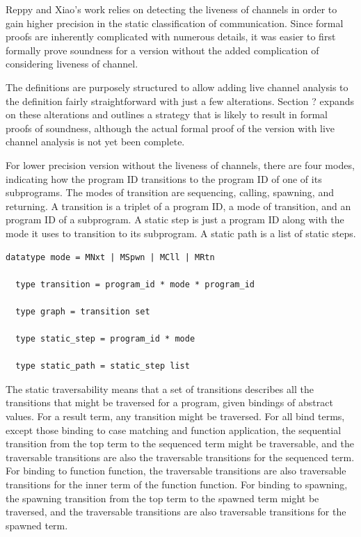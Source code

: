 \documentclass[10pt]{article}
\begin{document}
Reppy and Xiao's work relies on detecting the liveness of channels in order to gain higher
precision in the static classification of communication. Since formal proofs are inherently
complicated with numerous details, it was easier to first formally prove soundness for a
version without the added complication of considering liveness of channel.

The definitions are purposely structured to allow adding live channel analysis to the
definition fairly straightforward with just a few alterations.  Section ? expands on
these alterations and outlines a strategy that is likely to result in formal proofs of
soundness, although the actual formal proof of the version with live channel analysis is
not yet been complete.  

For lower precision version without the liveness of channels, there are four modes,
indicating how the program ID transitions to the program ID of one of
its subprograms.
The modes of transition are sequencing, calling, spawning, and returning. A transition is a
triplet of a program ID, a mode of transition, and an program ID of a
subprogram. A static step is just a program ID along with the mode it uses to
transition to its subprogram. A static path is a list of static steps.  

\begin{lstlisting}[language=logic, mathescape]
  datatype mode = MNxt | MSpwn | MCll | MRtn

  type transition = program_id * mode * program_id

  type graph = transition set

  type static_step = program_id * mode

  type static_path = static_step list
  \end{lstlisting}

The static traversability means that a set of transitions describes all the transitions
that might be traversed for a program, given bindings of abstract values.  For a result
term, any transition might be traversed.  For all bind terms, except those binding
to case matching and function application, the sequential transition from the top term to
the sequenced term might be traversable, and the traversable transitions are also the
traversable transitions for the sequenced term.  For binding to function function, the
traversable transitions are also traversable transitions for the inner term of the
function function.  For binding to spawning, the spawning transition from the top term
to the spawned term might be traversed, and the traversable transitions are also
traversable transitions for the spawned term.
\end{document}
